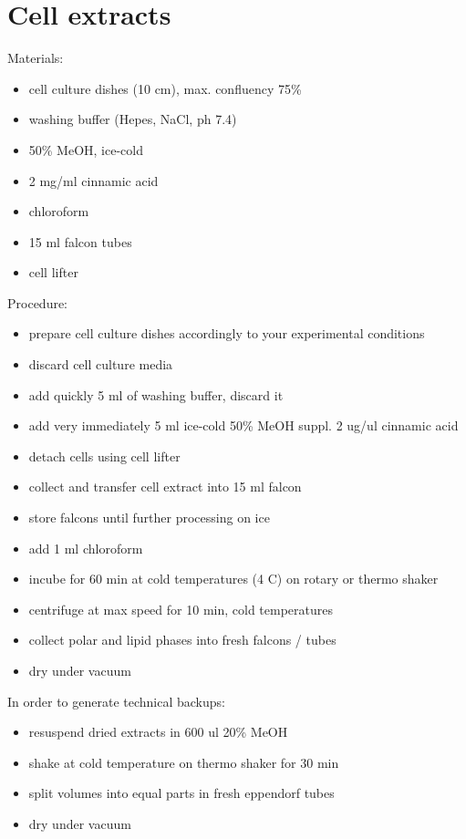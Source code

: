 \documentclass[]{book}
\providecommand{\tightlist}{%
  \setlength{\itemsep}{0pt}\setlength{\parskip}{0pt}}
\begin{document}
\section{Cell extracts}\label{cell-extracts}

Materials:

\begin{itemize}
\tightlist
\item
  cell culture dishes (10 cm), max. confluency 75\%
\item
  washing buffer (Hepes, NaCl, ph 7.4)
\item
  50\% MeOH, ice-cold
\item
  2 mg/ml cinnamic acid
\item
  chloroform
\item
  15 ml falcon tubes
\item
  cell lifter
\end{itemize}

Procedure:

\begin{itemize}
\tightlist
\item
  prepare cell culture dishes accordingly to your experimental
  conditions
\item
  discard cell culture media
\item
  add quickly 5 ml of washing buffer, discard it
\item
  add very immediately 5 ml ice-cold 50\% MeOH suppl. 2 ug/ul cinnamic
  acid
\item
  detach cells using cell lifter
\item
  collect and transfer cell extract into 15 ml falcon
\item
  store falcons until further processing on ice
\item
  add 1 ml chloroform
\item
  incube for 60 min at cold temperatures (4 C) on rotary or thermo
  shaker
\item
  centrifuge at max speed for 10 min, cold temperatures
\item
  collect polar and lipid phases into fresh falcons / tubes
\item
  dry under vacuum
\end{itemize}

In order to generate technical backups:

\begin{itemize}
\tightlist
\item
  resuspend dried extracts in 600 ul 20\% MeOH
\item
  shake at cold temperature on thermo shaker for 30 min
\item
  split volumes into equal parts in fresh eppendorf tubes
\item
  dry under vacuum
\end{itemize}
\end{document}
